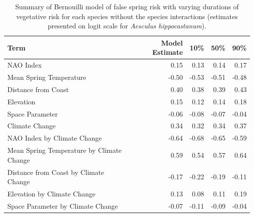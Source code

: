 \documentclass{article}\usepackage[]{graphicx}\usepackage[]{color}
\begin{document}
\begin{table}[H]
\centering
\caption{Summary of Bernouilli model of false spring risk with varying durations of vegetative risk for each species without the species interactions (estimates presented on logit scale for \textit{Aesculus hippocastanum}).} 
\begin{tabular}{lrrrr}
  \hline
Term & Model Estimate & 10\% & 50\% & 90\% \\ 
  \hline
NAO Index & 0.15 & 0.13 & 0.14 & 0.17 \\ 
  Mean Spring 
Temperature & -0.50 & -0.53 & -0.51 & -0.48 \\ 
  Distance from 
Coast & 0.40 & 0.38 & 0.39 & 0.43 \\ 
  Elevation & 0.15 & 0.12 & 0.14 & 0.18 \\ 
  Space Parameter & -0.06 & -0.08 & -0.07 & -0.04 \\ 
  Climate Change & 0.34 & 0.32 & 0.34 & 0.37 \\ 
  NAO Index by Climate Change & -0.64 & -0.68 & -0.65 & -0.59 \\ 
  Mean Spring 
Temperature by Climate Change & 0.59 & 0.54 & 0.57 & 0.64 \\ 
  Distance from 
Coast by Climate Change & -0.17 & -0.22 & -0.19 & -0.11 \\ 
  Elevation by Climate Change & 0.13 & 0.08 & 0.11 & 0.19 \\ 
  Space Parameter by Climate Change & -0.07 & -0.11 & -0.09 & -0.04 \\ 
   \hline
\end{tabular}
\end{table}
\end{document}

